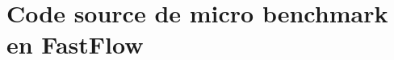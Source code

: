 \chapter{Code source de micro benchmark en FastFlow}
\label{sourceCodeMicrobenchmarkFastFlow.ann}



\newpage
